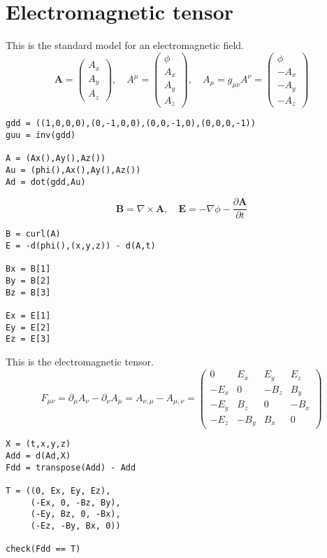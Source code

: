 

\section*{Electromagnetic tensor}

This is the standard model for an electromagnetic field.
\begin{equation*}
\mathbf A=\begin{pmatrix}A_x\\A_y\\A_z\end{pmatrix},\quad
A^\mu=\begin{pmatrix}\phi\\A_x\\A_y\\A_z\end{pmatrix},\quad
A_\mu=g_{\mu\nu}A^\nu=\begin{pmatrix}\phi\\-A_x\\-A_y\\-A_z\end{pmatrix}
\end{equation*}
{\footnotesize
\begin{verbatim}
gdd = ((1,0,0,0),(0,-1,0,0),(0,0,-1,0),(0,0,0,-1))
guu = inv(gdd)

A = (Ax(),Ay(),Az())
Au = (phi(),Ax(),Ay(),Az())
Ad = dot(gdd,Au)
\end{verbatim}}

\begin{equation*}
\mathbf B=\nabla\times\mathbf A,\quad
\mathbf E=-\nabla\phi-\frac{\partial\mathbf A}{\partial t}
\end{equation*}
{\footnotesize
\begin{verbatim}
B = curl(A)
E = -d(phi(),(x,y,z)) - d(A,t)

Bx = B[1]
By = B[2]
Bz = B[3]

Ex = E[1]
Ey = E[2]
Ez = E[3]
\end{verbatim}}

This is the electromagnetic tensor.
\begin{equation*}
F_{\mu\nu}
=\partial_\mu A_\nu-\partial_\nu A_\mu
=A_{\nu,\mu}-A_{\mu,\nu}
=\begin{pmatrix}
0 & E_x & E_y & E_z
\\
-E_x & 0 & -B_z & B_y
\\
-E_y & B_z & 0 & -B_x
\\
-E_z & -B_y & B_x & 0
\end{pmatrix}
\end{equation*}
{\footnotesize
\begin{verbatim}
X = (t,x,y,z)
Add = d(Ad,X)
Fdd = transpose(Add) - Add

T = ((0, Ex, Ey, Ez),
     (-Ex, 0, -Bz, By),
     (-Ey, Bz, 0, -Bx),
     (-Ez, -By, Bx, 0))

check(Fdd == T)
\end{verbatim}}

